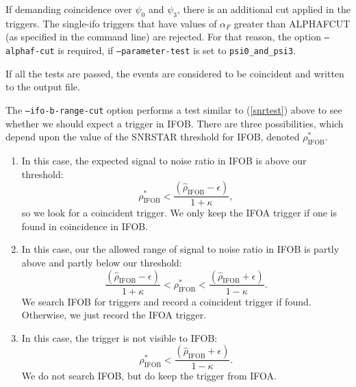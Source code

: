 \begin{entry}
If demanding coincidence over $\psi_0$ and $\psi_3$, there is an additional
cut applied in the triggers. The single-ifo triggers that have values
of $\alpha_F$ greater than ALPHAFCUT (as specified in the 
command line) are rejected. For that reason, the option 
\texttt{--alphaf-cut} is required, if \texttt{--parameter-test} is
set to \texttt{psi0\_and\_psi3}.

If all the tests are passed, the events are considered to be coincident
and written to the output file.


The \texttt{--ifo-b-range-cut} option performs a test similar to
(\ref{snrtest}) above to see whether we should expect a trigger in
\textsc{IFOB}.  There are three possibilities, which depend upon the
value of the \textsc{SNRSTAR} threshold for \textsc{IFOB}, denoted
$\rho_\mathrm{IFOB}^{*}$.

\begin{enumerate}

\item In this case, the expected signal to noise ratio in \textsc{IFOB} is
above our threshold:
%
\begin{equation} 
  \rho_\mathrm{IFOB}^{*} < \frac{(\hat{\rho}_\mathrm{IFOB} - \epsilon)}
  {1 + \kappa} , 
\end{equation}
%
so we look for a coincident trigger.  We only keep the 
\textsc{IFOA} trigger if one is found in coincidence in \textsc{IFOB}.

\item In this case, our the allowed range of signal to noise ratio in 
\textsc{IFOB} is partly above and partly below our threshold: 
%
\begin{equation}
  \frac{(\hat{\rho}_\mathrm{IFOB} - \epsilon)} {1 + \kappa} < 
  \rho_\mathrm{IFOB}^{*} <
  \frac{(\hat{\rho}_\mathrm{IFOB} + \epsilon)} {1 - \kappa} .
\end{equation}
%
We search \textsc{IFOB} for triggers and record a coincident trigger if
found.  Otherwise, we just record the \textsc{IFOA} trigger.

\item In this case, the trigger is not visible to \textsc{IFOB}:
%
\begin{equation}
  \rho_\mathrm{IFOB}^{*} <
  \frac{(\hat{\rho}_\mathrm{IFOB} + \epsilon)} {1 - \kappa} .
\end{equation}
%
We do not search \textsc{IFOB}, but do keep the trigger from \textsc{IFOA}.


\end{enumerate}


\end{entry}
